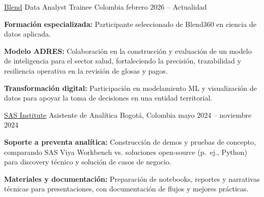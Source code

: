 
\begin{cventries}

  \cventry
    {\href{https://www.blend360.com/}{Blend}} %
    {Data Analyst Trainee} %
    {Colombia} %
    {febrero 2026 -- Actualidad} %
    {
      \begin{cvitems}
        \item {\textbf{Formación especializada:} Participante seleccionado de Blend360 en ciencia de datos aplicada.}
        \item {\textbf{Modelo ADRES:} Colaboración en la construcción y evaluación de un modelo de inteligencia para el sector salud, fortaleciendo la precisión, trazabilidad y resiliencia operativa en la revisión de glosas y pagos.}
        \item {\textbf{Transformación digital:} Participación en modelamiento ML y visualización de datos para apoyar la toma de decisiones en una entidad territorial.}
      \end{cvitems}
      \vspace{0.3em}
    }

  \vspace{0.6em}

  \cventry
    {\href{https://www.sas.com/en_us/home.html}{SAS Institute}} %
    {Asistente de Analítica} %
    {Bogotá, Colombia} %
    {mayo 2024 -- noviembre 2024} %
    {
      \begin{cvitems}
        \item {\textbf{Soporte a preventa analítica:} Construcción de demos y pruebas de concepto, comparando SAS Viya Workbench vs. soluciones open-source (p.\ ej., Python) para discovery técnico y solución de casos de negocio.}
        \item {\textbf{Materiales y documentación:} Preparación de notebooks, reportes y narrativas técnicas para presentaciones, con documentación de flujos y mejores prácticas.}
      \end{cvitems}
      \vspace{0.3em}
    }


\end{cventries}
